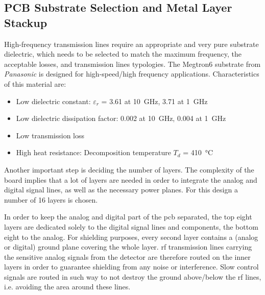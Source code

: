 \subsection{PCB Substrate Selection and Metal Layer Stackup}\label{ssec:substrate}
High-frequency transmission lines require an appropriate and very pure substrate dielectric, which needs to be selected to match the maximum frequency, the acceptable losses, and transmission lines typologies.
The Megtron6 substrate from \textit{Panasonic} is designed for high-speed/high frequency applications. 
Characteristics of this material are:
\begin{itemize}
\item Low dielectric constant: $\varepsilon_r$ = 3.61 at \SI{10}{\giga \hertz}, 3.71 at \SI{1}{\giga \hertz}
\item Low dielectric dissipation factor: 0.002 at \SI{10}{\giga \hertz}, 0.004 at \SI{1}{\giga \hertz}
\item Low transmission loss
\item High heat resistance: Decomposition temperature $T_d$ = \SI{410}{\celsius}
\end{itemize}

Another important step is deciding the number of layers. The complexity of the board implies that a lot of layers are needed in order to integrate the analog and digital signal lines, as well as the necessary power planes.
For this design a number of 16 layers is chosen.

In order to keep the analog and digital part of the \gls{pcb} separated, the top eight layers are dedicated solely to the digital signal lines and components, the bottom eight to the analog.
For shielding purposes, every second layer contains a (analog or digital) ground plane covering the whole layer.
\gls{rf} transmission lines carrying the sensitive analog signals from the detector are therefore routed on the inner layers in order to guarantee shielding from any noise or interference.
Slow control signals are routed in such way to not destroy the ground above/below the \gls{rf} lines, i.e. avoiding the area around these lines.

